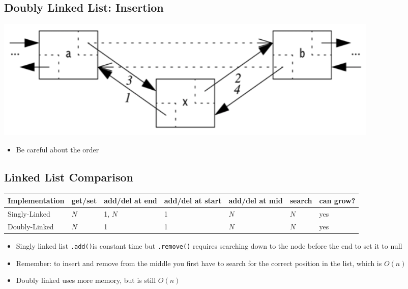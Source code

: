 \documentclass[10pt]{article}
\begin{document}
\subsection*{Doubly Linked List: Insertion}
\begin{center}
    \includegraphics[width=\textwidth/4]{images/9.png}
\end{center}
\begin{itemize}
    \item Be careful about the order
\end{itemize}

\subsection*{Linked List Comparison}
\begin{center}
\begin{tabular}{lllllll}\toprule
    Implementation & get/set & add/del at end & add/del at start & add/del at mid & search & can grow? \\ \midrule
        Singly-Linked & $N$ & 1, $N$ & 1 & $N$ & $N$ & yes \\
        Doubly-Linked & $N$ & 1 & 1 & $N$ & $N$ & yes \\ \bottomrule
\end{tabular}
\end{center}
\begin{itemize}
    \item Singly linked list \texttt{.add()}is constant time but \texttt{.remove()} requires searching down to the node before the end to set it to null
    \item Remember: to insert and remove from the middle you first have to search for the correct position in the list, which is $O(n)$
    \item Doubly linked uses more memory, but is still $O(n)$
\end{itemize}
\end{document}
